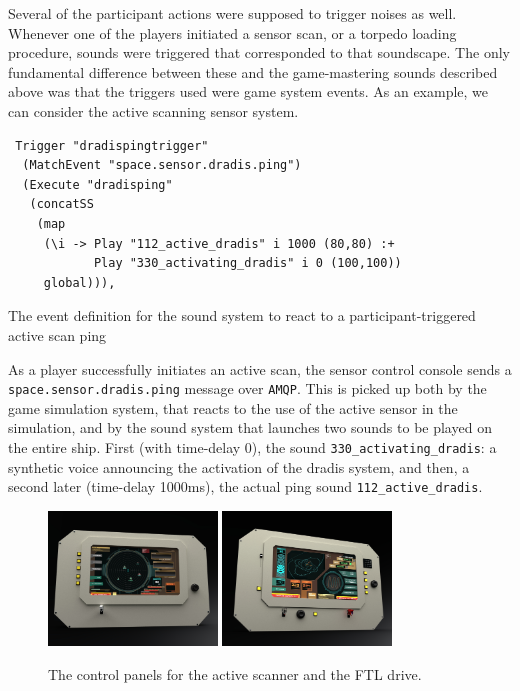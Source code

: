 Several of the participant actions were supposed to trigger noises as well. Whenever one of the players initiated a sensor scan, or a torpedo loading procedure, sounds were triggered that corresponded to that soundscape. The only fundamental difference between these and the game-mastering sounds described above was that the triggers used were game system events. As an example, we can consider the active scanning sensor system.

\begin{listing}
\begin{verbatim}
 Trigger "dradispingtrigger" 
  (MatchEvent "space.sensor.dradis.ping") 
  (Execute "dradisping" 
   (concatSS 
    (map 
     (\i -> Play "112_active_dradis" i 1000 (80,80) :+ 
            Play "330_activating_dradis" i 0 (100,100)) 
     global))),
\end{verbatim}
\caption{The event definition for the sound system to react to a participant-triggered
  active scan ping}
\end{listing}

As a player successfully initiates an active scan, the sensor control console sends a \texttt{space.sensor.dradis.ping} message over \texttt{AMQP}. This is picked up both by the game simulation system, that reacts to the use of the active sensor in the simulation, and by the sound system that launches two sounds to be played on the entire ship. First (with time-delay 0), the sound \texttt{330\_activating\_dradis}: a synthetic voice announcing the activation of the dradis system, and then, a second later (time-delay 1000ms), the actual ping sound \texttt{112\_active\_dradis}.

\begin{figure}
  \includegraphics[width=0.4\textwidth]{img/Dradis.jpg}\hfill
  \includegraphics[width=0.4\textwidth]{img/Helm.jpg}
  \caption{The control panels for the active scanner and the FTL drive.}
  \label{fig:dradis}
\end{figure}


